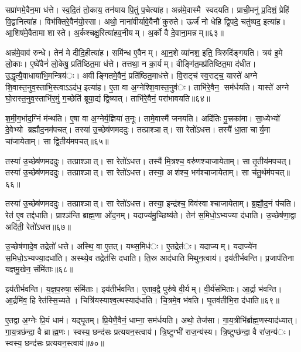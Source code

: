 सप्रा॑णमे॒वैन॒मा ध॑त्ते। स्व॒दि॒तं तो॒काय॒ तन॑याय पि॒तुं प॒चेत्या॑ह। अन्न॑मे॒वास्मै स्वदयति। प्राची॒मनु॑ प्र॒दिशं॒ प्रेहि॑ वि॒द्वानित्या॑ह। विभ॑क्तिरे॒वैन॑यो॒स्सा। अथो॒ नाना॑वीर्यावे॒वैनौ॑ कुरुते। ऊर्जं॑ नो धेहि द्वि॒पदे॒ चतु॑ष्पद॒ इत्या॑ह। आ॒शिष॑मे॒वैतामा शास्ते। अ॒र्कश्चक्षु॒रित्या॑हव॒नीयम्। अ॒र्को वै दे॒वाना॒मन्नम्॥६३॥

अन्न॑मे॒वाव॑ रुन्धे। तेन॑ मे दीदि॒हीत्या॑ह। समि॑न्ध ए॒वैनम्। आ॒न॒शे व्या॑नश॒ इति॒ त्रिरुदि॑ङ्गयति। त्रय॑ इ॒मे लो॒काः। ए॒ष्वे॑वैनं॑ लो॒केषु॒ प्रति॑ष्ठित॒मा ध॑त्ते। तत्तथा॒ न का॒र्यम्। वीङ्गि॑त॒मप्र॑तिष्ठित॒मा द॑धीत। उ॒द्धृत्यै॒वाधाया॑भि॒मन्त्रिय॑ः। अवीङ्गितमे॒वैनं॒ प्रति॑ष्ठित॒माध॑त्ते। वि॒राट्च॑ स्व॒राट्च॒ यास्ते॑ अग्ने शि॒वास्त॒नुव॒स्ताभि॒स्त्वाऽऽद॑ध॒ इत्या॑ह। ए॒ता वा अ॒ग्नेश्शि॒वास्त॒नुव॑ः। ताभि॑रे॒वैन॒ सम॑र्धयति। यास्ते॑ अग्ने घो॒रास्त॒नुव॒स्ताभि॑र॒मुं ग॒च्छेति॑ ब्रूया॒द्यं द्वि॒ष्यात्। ताभि॑रे॒वैनं॒ परा॑भावयति॥६४॥\anuvakamend[लो॒को॑ऽसृजतैन॒माध॑त्तेऽन्वाहार्य॒पच॑नं दे॒वाना॒मन्न॑मेनं॒ प्रति॑ष्ठित॒माध॑त्ते॒ पञ्च॑ च]

श॒मी॒ग॒र्भाद॒ग्निं म॑न्थति। ए॒षा वा अ॒ग्नेर्य॒ज्ञिया॑ त॒नूः। तामे॒वास्मै॑ जनयति। अदि॑तिः पु॒त्त्रका॑मा। सा॒ध्येभ्यो॑ दे॒वेभ्यो ब्रह्मौद॒नम॑पचत्। तस्या॑ उ॒च्छेष॑णमददुः। तत्प्राश्ञात्। सा रेतो॑ऽधत्त। तस्यै॑ धा॒ता चार्य॒मा चा॑जायेताम्। सा द्वि॒तीय॑मपचत्॥६५॥

तस्या॑ उ॒च्छेष॑णमददुः। तत्प्राश्ञात्। सा रेतो॑ऽधत्त। तस्यै॑ मि॒त्रश्च॒ वरु॑णश्चाजायेताम्। सा तृ॒तीय॑मपचत्। तस्या॑ उ॒च्छेष॑णमददुः। तत्प्राश्ञात्। सा रेतो॑ऽधत्त। तस्या॒ अश॑श्च॒ भग॑श्चाजायेताम्। सा च॑तु॒र्थम॑पचत्॥६६॥

तस्या॑ उ॒च्छेष॑णमददुः। तत्प्राश्ञात्। सा रेतो॑ऽधत्त। तस्या॒ इन्द्र॑श्च॒ विव॑स्वाश्चाजायेताम्। ब्र॒ह्मौ॒द॒नं प॑चति। रेत॑ ए॒व तद्द॑धाति। प्राश्ञ॑न्ति ब्राह्म॒णा ओ॑द॒नम्। यदाज्य॑मु॒च्छिष्य॑ते। तेन॑ स॒मिधो॒ऽभ्यज्या द॑धाति। उ॒च्छेष॑णा॒द्वा अदि॑ती॒ रेतो॑ऽधत्त॥६७॥

उ॒च्छेष॑णादे॒व तद्रेतो॑ धत्ते। अस्थि॒ वा ए॒तत्। यथ्स॒मिध॑ः। ए॒तद्रेत॑ः। यदाज्यम्। यदाज्ये॑न स॒मिधो॒ऽभ्यज्या॒दधा॑ति। अस्थ्ये॒व तद्रेत॑सि दधाति। ति॒स्र आद॑धाति मिथुन॒त्वाय॑। इय॑तीर्भवन्ति। प्र॒जाप॑तिना यज्ञमु॒खेन॒ संमि॑ताः॥६८॥

इय॑तीर्भवन्ति। य॒ज्ञ॒प॒रुषा॒ संमि॑ताः। इय॑तीर्भवन्ति। ए॒ताव॒द्वै पुरु॑षे वी॒र्यम्। वी॒र्य॑संमिताः। आ॒र्द्रा भ॑वन्ति। आ॒र्द्रमि॑व॒ हि रेत॑स्सि॒च्यते। चित्रि॑यस्याश्व॒त्थस्याद॑धाति। चि॒त्रमे॒व भ॑वति। घृ॒तव॑तीभि॒रा द॑धाति॥६९॥

ए॒तद्वा अ॒ग्नेः प्रि॒यं धाम॑। यद्घृ॒तम्। प्रि॒येणै॒वैनं॒ धाम्ना॒ सम॑र्धयति। अथो॒ तेज॑सा। गा॒य॒त्रीभि॑र्ब्राह्म॒णस्याद॑ध्यात्। गा॒य॒त्रछ॑न्दा॒ वै ब्राह्म॒णः। स्वस्य॒ छन्द॑सः प्रत्ययन॒स्त्वाय॑। त्रि॒ष्टुग्भी॑ राज॒न्य॑स्य। त्रि॒ष्टुप्छ॑न्दा॒ वै रा॑ज॒न्य॑ः। स्वस्य॒ छन्द॑सः प्रत्ययन॒स्त्वाय॑॥७०॥

